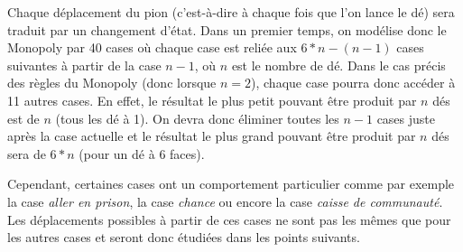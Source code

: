 \documentclass[letterpaper]{article}
\newcommand{\colornode}[1][]{\node[state,
	    align=center,
	    text=gray!40!black,
	    draw=gray,
	    fill=gray!20!white,{#1}]}
\newcommand{\drawedge}{\draw[every loop, line width=0.4mm, fill=gray, draw=gray]}
\begin{document}
    Chaque déplacement du pion (c'est-à-dire à chaque fois que l'on lance le dé) sera
    traduit par un changement d'état.
    Dans un premier temps, on modélise donc le Monopoly par 40 cases où chaque case est
    reliée aux $6*n-(n-1)$ cases suivantes à partir de la case $n-1$, où $n$ est le
    nombre de dé.  Dans le cas précis des règles du Monopoly (donc lorsque $n = 2$),
    chaque case pourra donc accéder à 11 autres cases.  En effet, le résultat le plus
    petit pouvant être produit par $n$ dés est de $n$ (tous les dé à 1).
    On devra donc éliminer toutes les $n-1$ cases juste après la case actuelle et le résultat
    le plus grand pouvant être produit par $n$ dés sera de $6*n$ (pour un dé à 6 faces).
    \begin{center}
    \end{center}
    Cependant, certaines cases ont un comportement particulier comme par exemple la
    case \textit{aller en prison}, la case \textit{chance} ou encore la case
    \textit{caisse de communauté}.  Les déplacements possibles à partir de ces cases
    ne sont pas les mêmes que pour les autres cases et seront donc étudiées dans les
    points suivants.
\end{document}
